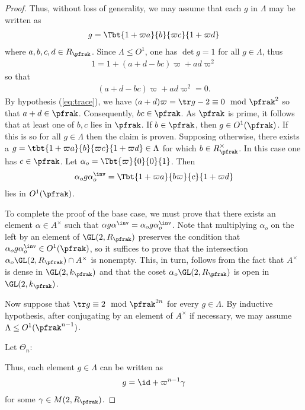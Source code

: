 \begin{proof}
	Thus, without loss of generality, we may assume that each $g$ in $\Lambda$ may be written as
	\begin{align*}
		g = \Tbt{1+\varpi a}{b}{\varpi c}{1+\varpi d}
	\end{align*}
	where $a,b,c,d \in R_\pfrak$.
	Since $\Lambda \leq O^1$, one has $\det g = 1 $ for all $g\in \Lambda$, thus
	\begin{align*}
		1 = 1 + (a+d - bc) \varpi + ad \varpi^2
	\end{align*}
	so that
	\begin{align}\label{eq:MandarinLeyden}
		(a+d - bc) \varpi + ad \varpi^2 =0.
	\end{align}
	By hypothesis (\ref{eq:trace}), we have $(a+d)\varpi = \tr g -2 \equiv 0 \mod \pfrak^2$ so that $a+d \in \pfrak$. Consequently, $bc \in \pfrak$. As $\pfrak$ is prime, it follows that at least one of $b,c$ lies in $\pfrak$. If $b \in \pfrak$, then $g \in O^1(\pfrak)$. If this is so for all $g \in \Lambda$ then the claim is proven. Supposing otherwise, there exists a $g=\tbt{1+\varpi a}{b}{\varpi c}{1+\varpi d} \in \Lambda$ for which $b \in R_\pfrak^\times$. In this case one has $c \in \pfrak$. Let $\alpha_o = \Tbt{\varpi}{0}{0}{1}$. Then
	\begin{align*}
		\alpha_o g\alpha_o^\inv  = \Tbt{1+\varpi a}{b\varpi}{c}{1+\varpi d}
	\end{align*}
	lies in $O^1(\pfrak)$.

	To complete the proof of the base case, we must prove that there exists an element $\alpha \in A^\times $ such that $\alpha g \alpha^\inv =  \alpha_o g \alpha_o^\inv$. Note that multiplying $\alpha_o$ on the left by an element of $\GL(2,R_\pfrak)$ preserves the condition that $\alpha_o g \alpha_o^\inv \in O^1(\pfrak)$, so it suffices to prove that the intersection $\alpha_o \GL(2,R_\pfrak) \cap A^\times $ is nonempty. This, in turn, follows from the fact that $A^\times$ is dense in $\GL(2,k_\pfrak)$ and that the coset  $\alpha_o \GL(2,R_\pfrak)$ is open in $\GL(2,k_\pfrak)$.

	Now suppose that $\tr g \equiv 2 \mod \pfrak^{2n}$ for every $g\in \Lambda$. By inductive hypothesis, after conjugating by an element of $A^\times$ if necessary, we may assume $\Lambda \leq O^1(\pfrak^{n-1})$.

	Let $\Theta_n :$

	Thus, each element $g\in \Lambda$ can be written as
	\begin{align}\label{eq:AppleWensleydale}
		g = \id +\varpi^{n-1} \gamma
	\end{align}
	for some $\gamma \in M(2, R_\pfrak)$.


\end{proof}
